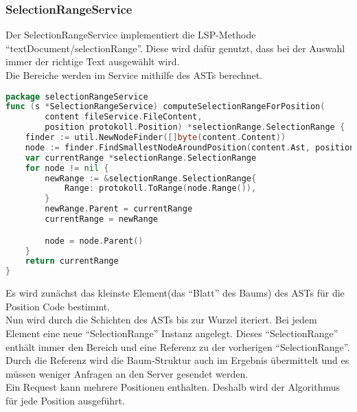 \documentclass[./einleitung.tex]{subfiles}
\begin{document}
    \subsubsection{SelectionRangeService}
    Der SelectionRangeService implementiert die LSP-Methode ``textDocument/selectionRange''.
    Diese wird dafür genutzt, dass bei der Auswahl immer der richtige Text ausgewählt wird. \\
    Die Bereiche werden im Service mithilfe des ASTs berechnet.
    \begin{lstlisting}[language=Go]
package selectionRangeService
func (s *SelectionRangeService) computeSelectionRangeForPosition(
        content fileService.FileContent,
        position protokoll.Position) *selectionRange.SelectionRange {
	finder := util.NewNodeFinder([]byte(content.Content))
	node := finder.FindSmallestNodeAroundPosition(content.Ast, position)
	var currentRange *selectionRange.SelectionRange
	for node != nil {
		newRange := &selectionRange.SelectionRange{
			Range: protokoll.ToRange(node.Range()),
		}
		newRange.Parent = currentRange
		currentRange = newRange

		node = node.Parent()
	}
	return currentRange
}
    \end{lstlisting}
    Es wird zunächst das kleinste Element(das ``Blatt'' des Baums) des ASTs für die Position Code bestimmt.\\
    Nun wird durch die Schichten des ASTs bis zur Wurzel iteriert.
    Bei jedem Element eine neue ``SelectionRange'' Instanz  angelegt.
    Dieses ``SelectionRange'' enthält immer den Bereich und eine Referenz zu der vorherigen ``SelectionRange''.
    Durch die Referenz wird die Baum-Struktur auch im Ergebnis übermittelt und es müssen weniger Anfragen an den Server gesendet werden.\\

    Ein Request kann mehrere Positionen enthalten.
    Deshalb wird der Algorithmus für jede Position ausgeführt.
\end{document}
